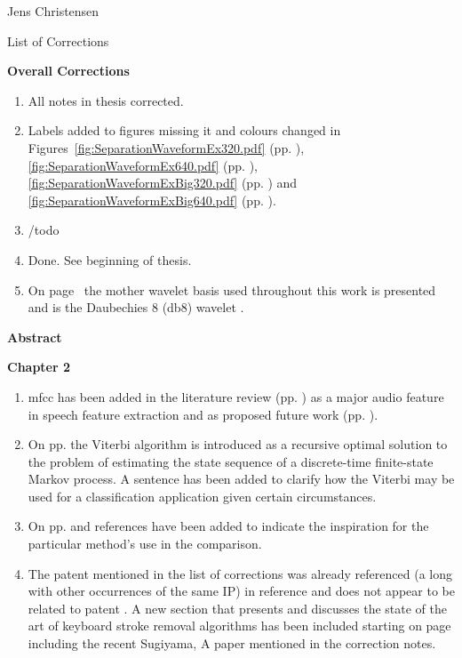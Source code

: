 \clearpage
\thispagestyle{empty}
Jens Christensen

List of Corrections

\textbf{Overall Corrections}

\begin{enumerate}
  \item All notes in thesis corrected.
  \item Labels added to figures missing it and colours changed in Figures~\ref{fig:SeparationWaveformEx320.pdf} (pp. \pageref{fig:SeparationWaveformEx320.pdf}), \ref{fig:SeparationWaveformEx640.pdf} (pp. \pageref{fig:SeparationWaveformEx640.pdf}), \ref{fig:SeparationWaveformExBig320.pdf} (pp. \pageref{fig:SeparationWaveformExBig320.pdf}) and \ref{fig:SeparationWaveformExBig640.pdf} (pp. \pageref{fig:SeparationWaveformExBig640.pdf}).
  \item /todo
  \item Done. See beginning of thesis.
  \item On page~\pageref{corrections:motherWavelet} the mother wavelet basis used throughout this work is presented and is the Daubechies 8 (db8) wavelet \cite{Daubechies1992}.
\end{enumerate}

\textbf{Abstract}

\textbf{Chapter 2}
\begin{enumerate}
\item \gls{mfcc} has been added in the literature review (pp. \pageref{corrections:mfcc1}) as a major audio feature in speech feature extraction and as proposed future work (pp. \pageref{corrections:mfcc2}).
    \item On pp. \pageref{corrections:viterbi} the Viterbi algorithm is introduced as a recursive optimal solution to the problem of estimating the state sequence of a discrete-time finite-state Markov process. A sentence has been added to clarify how the Viterbi may be used for a classification application given certain circumstances.
    \item On pp. \pageref{fig:LitRev_DetectCompare} and \pageref{fig:LitRev_DetectCompare2} references have been added to indicate the inspiration for the particular method's use in the comparison.
    \item The patent mentioned in the list of corrections was already referenced (a long with other occurrences of the same IP) in reference \cite{Seltzer2011Patent} and does not appear to be related to patent \cite{US8233353}. A new section that presents and discusses the state of the art of keyboard stroke removal algorithms has been included starting on page \pageref{corrections:methods} including the recent Sugiyama, A paper mentioned in the correction notes.
    \end{enumerate}
    
